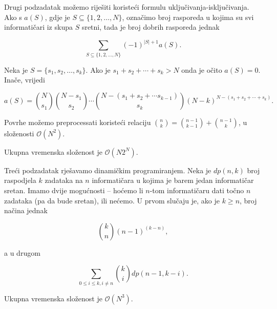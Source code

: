 \documentclass[a4paper]{article}
\begin{document}
Drugi podzadatak možemo riješiti koristeći formulu uključivanja-isključivanja.
Ako s $a(S)$, gdje je $S \subseteq \{1, 2, \ldots, N\}$, označimo broj rasporeda
u kojima su svi informatičari iz skupa $S$ sretni, tada je broj dobrih
rasporeda jednak

$$\sum_{S \subseteq \{1, 2, \ldots, N\}}{(-1)^{|S| + 1} a(S)}.$$

Neka je $S = \{s_1, s_2, \ldots, s_k\}$. Ako je $s_1 + s_2 + \cdots + s_k > N$
onda je očito $a(S) = 0$. Inače, vrijedi 

$$a(S) = \binom{N}{s_1} \binom{N - s_1}{s_2} \cdots \binom{N - (s_1 + s_2 +
\cdots s_{k-1})}{s_k} (N - k)^{N - (s_1 + s_2 + \cdots + s_k)}.$$

Povrhe možemo preprocessati koristeći relaciju $\binom{n}{k} = \binom{n - 1}{k
- 1} + \binom{n - 1}{k}$, u složenosti $\mathcal{O}(N^2)$.

Ukupna vremenska složenost je $\mathcal{O}(N 2^N)$.

Treći podzadatak rješavamo dinamičkim programiranjem. Neka je $dp(n, k)$ broj
raspodjela $k$ zadataka na $n$ informatičara u kojima je barem jedan informatičar
sretan. Imamo dvije mogućnosti -- hoćemo li $n$-tom informatičaru dati točno $n$
zadataka (pa da bude sretan), ili nećemo. U prvom slučaju je, ako je $k \geq n$,
broj načina jednak

$$\binom{k}{n} (n - 1)^{(k - n)},$$

a u drugom

$$\sum_{0 \leq i \leq k, i \neq n}{\binom{k}{i} dp(n - 1, k - i)}.$$

Ukupna vremenska složenost je $\mathcal{O}(N^3)$.
\end{document}
